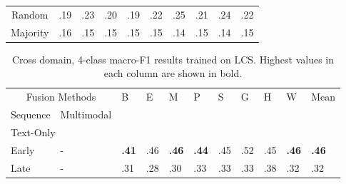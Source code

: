 \documentclass{article}
\begin{document}
\begin{table}[H]
\begin{tabular}{|lllllllllll|}
\multicolumn{2}{|c|}{Random}                                                      & .19                & .23                & .20                & .19                & .22                & .25                & .21                & \multicolumn{1}{l|}{.24}                & .22                   \\
\multicolumn{2}{|c|}{Majority}                                                    & .16                & .15                & .15                & .15                & .15                & .14                & .15                & \multicolumn{1}{l|}{.14}                & .15                   \\ \hline
\end{tabular}
\end{table}

\begin{table}[H]
\centering
\caption{Cross domain, 4-class macro-F1 results trained on LCS. Highest values in each column are shown in bold.}
\begin{tabular}{|lllllllllll|}
\hline
\multicolumn{2}{|c|}{Fusion Methods}                                                      & \multirow{2}{*}{B} & \multirow{2}{*}{E} & \multirow{2}{*}{M} & \multirow{2}{*}{P} & \multirow{2}{*}{S} & \multirow{2}{*}{G} & \multirow{2}{*}{H} & \multicolumn{1}{l|}{\multirow{2}{*}{W}} & \multirow{2}{*}{Mean} \\ \cline{1-2}
\multicolumn{1}{|l|}{Sequence}               & \multicolumn{1}{l|}{Multimodal}    &                    &                    &                    &                    &                    &                    &                    & \multicolumn{1}{l|}{}                   &                       \\ \hline
\multicolumn{11}{|l|}{Text-Only}                                                                                                                                                                                                                                                                       \\ \hline
\multicolumn{1}{|l|}{Early}                  & \multicolumn{1}{l|}{-}             & \textbf{.41}       & .46                & \textbf{.46}       & \textbf{.44}       & .45                & .52                & .45                & \multicolumn{1}{l|}{\textbf{.46}}       & \textbf{.46}          \\
\multicolumn{1}{|l|}{Late}                   & \multicolumn{1}{l|}{-}             & .31                & .28                & .30                & .33                & .33                & .33                & .38                & \multicolumn{1}{l|}{.32}                & .32                   \\ \hline

\end{tabular}
\end{table}
\end{document}
